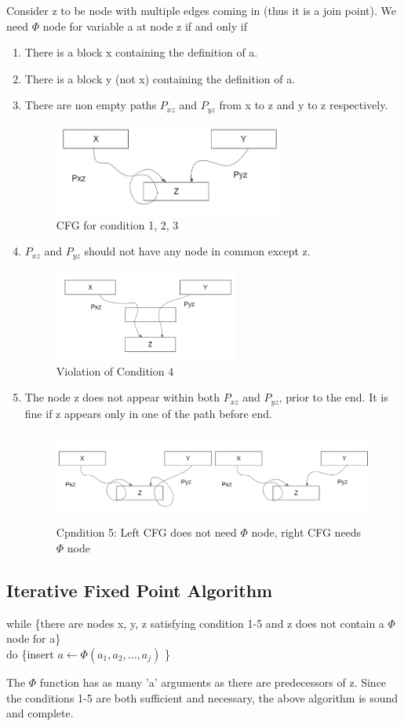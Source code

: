 Consider z to be node with multiple edges coming in (thus it is a join point). We need \(\Phi\) node for variable a at node z if and only if
\begin{enumerate}
    \item There is a block x containing the definition of a.
    \item There is a block y (not x) containing the definition of a.
    \item There are non empty paths \(P_{xz}\) and \(P_{yz}\) from x to z and y to z respectively.
            \begin{figure}[htp]
\centering
\includegraphics[height=3cm]{images/Condition123.png}
\caption{CFG for condition 1, 2, 3}
\end{figure}
    \item \(P_{xz}\) and \(P_{yz}\) should not have any node in common except z.
        \begin{figure}[htp]
\centering
\includegraphics[height=3cm]{images/Condtion4.png}
\caption{Violation of Condition 4}
\end{figure}
    \item The node z does not appear within both  \(P_{xz}\) and \(P_{yz}\), prior to the end. It is fine if z appears only in one of the path before end.
            \begin{figure}[htp]
\centering
\includegraphics[height=3cm]{images/Condition5.png}
\caption{Cpndition 5: Left CFG does not need \(\Phi\) node, right CFG needs \(\Phi\) node}
\end{figure}
\end{enumerate}

\subsection{Iterative Fixed Point Algorithm}

while \{there are nodes x, y, z satisfying condition 1-5 and z does not contain a \(\Phi\) node for a\}\\
do \{insert \(a \leftarrow \Phi(a_1, a_2, ..., a_j)\) \}

The \(\Phi\) function has as many 'a' arguments as there are predecessors of z. Since the conditions 1-5 are both sufficient and necessary, the above algorithm is sound and complete.
